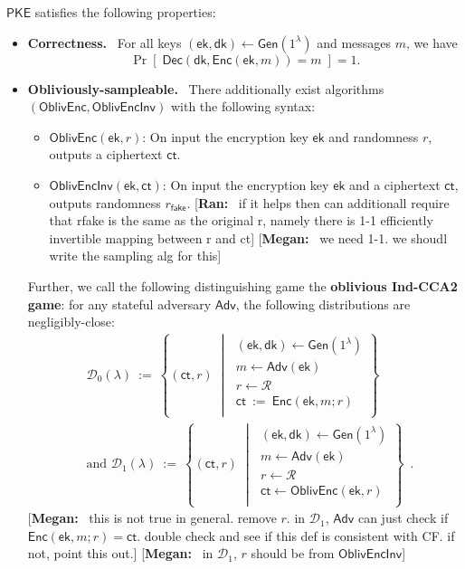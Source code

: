 \documentclass[11pt,letterpaper]{article}
\renewcommand{\emph}[1]{\textbf{#1}~}
\newcommand{\authnote}[2]{[{\color{red}\textbf{#1:}}~{\color{blue} #2}]}
\newcommand{\authnote}[2]{}
\newcommand{\megan}[1]{\authnote{Megan}{#1}}
\newcommand{\ran}[1]{\authnote{Ran}{#1}}
\theoremstyle{plain} %
\theoremstyle{definition} %
\theoremstyle{remark} %
\newcommand{\eqdef}{\ {:=} \ }
\newcommand{\SecParam}{\lambda}
\newcommand{\PKE}{\mathsf{PKE}}
\newcommand{\Gen}{\mathsf{Gen}}
\newcommand{\Enc}{\mathsf{Enc}}
\newcommand{\OblivEnc}{\mathsf{OblivEnc}}
\newcommand{\OblivEncInv}{\mathsf{OblivEncInv}}
\newcommand{\Dec}{\mathsf{Dec}}
\newcommand{\EncKey}{\mathsf{ek}}
\newcommand{\DecKey}{\mathsf{dk}}
\newcommand{\Msg}{m}
\newcommand{\Ct}{\mathsf{ct}}
\newcommand{\Rand}{r}
\newcommand{\FakeRand}{r_{\mathsf{fake}}}
\newcommand{\Distribution}{\mathcal{D}}
\newcommand{\RandSpace}{\mathcal{R}}
\newcommand{\Adversary}{{\mathsf{Adv}}} %
\newcommand{\pST}{\; \middle| \;}
\begin{document}
$\PKE$ satisfies the following properties:
\begin{itemize}
    \item \emph{Correctness.} For all keys $(\EncKey, \DecKey) \gets \Gen(1^{\SecParam})$ and messages $\Msg$, we have
    \[ \Pr[\; \Dec(\DecKey, \Enc(\EncKey, \Msg)) = \Msg \;] = 1. \]

    \item \emph{Obliviously-sampleable.} There additionally exist algorithms $(\OblivEnc, \OblivEncInv)$ with the following syntax:
    \begin{itemize}
    	\item $\OblivEnc(\EncKey,\Rand)$: On input the encryption key $\EncKey$ and randomness $\Rand$, outputs a ciphertext $\Ct$.
    	\item $\OblivEncInv(\EncKey,\Ct)$: On input the encryption key $\EncKey$ and a ciphertext $\Ct$, outputs randomness $\FakeRand$. \ran{if it helps then can additionall require that rfake is the same as the original r,  namely there is 1-1 efficiently invertible mapping between r and ct} \megan{we need 1-1. we shoudl write the sampling alg for this}
    \end{itemize}

    Further, we call the following distinguishing game the \textbf{oblivious Ind-CCA2 game}: for any stateful adversary $\Adversary$, the following distributions are negligibly-close:
    \begin{align*}
		&\Distribution_0(\SecParam) \eqdef \left\{
		(\Ct,\Rand)
		\pST
		\begin{array}{r}
            (\EncKey,\DecKey)\gets \Gen(1^\SecParam)\\
			\Msg \gets \Adversary(\EncKey)\\
            \Rand \gets \RandSpace\\
			\Ct \eqdef \Enc(\EncKey,\Msg;\Rand)\\
		\end{array}
		\right\} \\
		&\text{and } \Distribution_1(\SecParam) \eqdef \left\{
		(\Ct, \Rand)
		\pST
		\begin{array}{r}
            (\EncKey,\DecKey)\gets \Gen(1^\SecParam)\\
            \Msg \gets \Adversary(\EncKey)\\
            \Rand \gets \RandSpace\\
            \Ct \gets \OblivEnc(\EncKey,\Rand)\\
		\end{array}
		\right\} \enspace.
	\end{align*}
    \megan{this is not true in general. remove $r$. in $\Distribution_1$, $\Adversary$ can just check if $\Enc(\EncKey, \Msg; \Rand) = \Ct$. double check and see if this def is consistent with CF. if not, point this out.}
    \megan{in $\Distribution_1$, $\Rand$ should be from $\OblivEncInv$}
\end{itemize}
\end{document}
